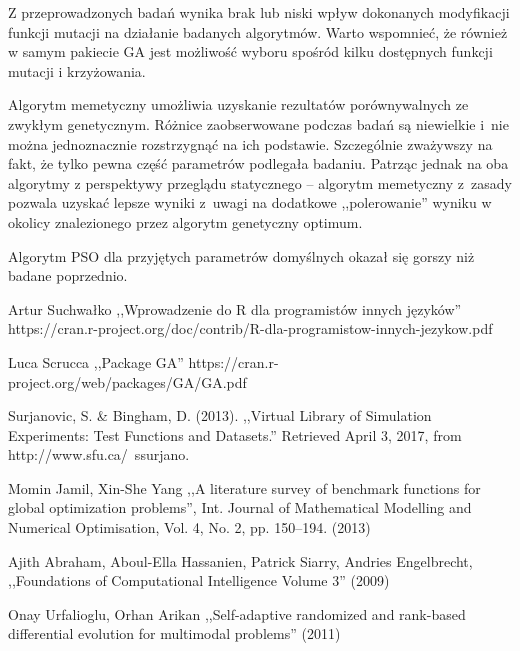 \documentclass[11pt, a4paper]{article}
\newcommand{\fbi}{\leavevmode{\parindent=1em\indent}}
\begin{document}
\fbi
Z przeprowadzonych badań wynika brak lub niski wpływ dokonanych modyfikacji funkcji mutacji na działanie badanych algorytmów. Warto wspomnieć, że również w samym pakiecie GA jest możliwość wyboru spośród kilku dostępnych funkcji mutacji i krzyżowania.

\fbi
Algorytm memetyczny umożliwia uzyskanie rezultatów porównywalnych ze zwykłym genetycznym. Różnice zaobserwowane podczas badań są niewielkie i~nie można jednoznacznie rozstrzygnąć na ich podstawie. Szczególnie zważywszy na fakt, że tylko pewna część parametrów podlegała badaniu. Patrząc jednak na oba algorytmy z perspektywy przeglądu statycznego -- algorytm memetyczny z~zasady pozwala uzyskać lepsze wyniki z~uwagi na dodatkowe ,,polerowanie'' wyniku w okolicy znalezionego przez algorytm genetyczny optimum.

\fbi
Algorytm PSO dla przyjętych parametrów domyślnych okazał się gorszy niż badane poprzednio.

\newpage
\begin{thebibliography}{40}

Artur Suchwałko ,,Wprowadzenie do R dla programistów innych języków'' https://cran.r-project.org/doc/contrib/R-dla-programistow-innych-jezykow.pdf

Luca Scrucca ,,Package GA''
https://cran.r-project.org/web/packages/GA/GA.pdf

Surjanovic, S. \& Bingham, D. (2013). ,,Virtual Library of Simulation Experiments: Test Functions and Datasets.'' Retrieved April 3, 2017, from http://www.sfu.ca/~ssurjano.

Momin Jamil, Xin-She Yang ,,A literature survey of benchmark functions for global optimization problems'', Int. Journal of Mathematical Modelling and Numerical Optimisation, Vol. 4, No. 2, pp. 150–194. (2013)

Ajith Abraham, Aboul-Ella Hassanien, Patrick Siarry, Andries Engelbrecht, ,,Foundations of Computational Intelligence Volume 3'' (2009)

Onay Urfalioglu, Orhan Arikan ,,Self-adaptive randomized and rank-based differential evolution for multimodal problems'' (2011)

\end{thebibliography}
\end{document}
